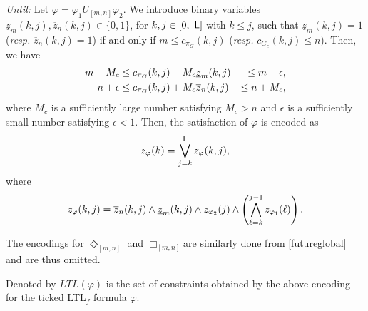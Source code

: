 \documentclass[journal,twoside,web]{IEEEtran}
\newcommand{\req}[1]{\eqref{#1}}
\newcommand{\Len}{{\sf L}}
\begin{document}
\textit{Until:} 
Let $\varphi = \varphi_1 U_{[m,n]} \varphi_2$. We introduce binary variables $\underline{z}_m (k, j), \overline{z}_n (k, j) \in \{0, 1\}$, for $k, j \in [0,\ \Len]$ with $k\leq j$,
such that $\underline{z}_m (k,j) = 1$ ({\sl resp.} $\overline{z}_n (k, j) = 1$) if and only if $m \leq c_{\pi_G} (k, j)$ ({\sl resp.} $c_{G_e}(k,j) \leq n$). Then, we have 
\begin{eqnarray}
m - M_c &\leq c_{\pi_G} (k, j) - M_c \underline{z}_m(k,j) &\leq m - \epsilon, \notag\\ 
{n} + \epsilon  &\leq  c_{\pi_G} (k, j) + M_c \overline{z}_n(k,j) &\leq {n}+M_c, \notag
\end{eqnarray}
where $M_c$ is a sufficiently large number satisfying $M_c >n$ and $\epsilon$ is a sufficiently small number satisfying $\epsilon<1$.
Then, the satisfaction of $\varphi$ is encoded as 
\begin{align}%
z_\varphi (k) = \bigvee^{\Len} _{j=k} z_\varphi (k, j),
\end{align}
where 
\begin{align}%
z_\varphi (k, j) = \overline{z}_n (k,j) \wedge  \underline{z}_m (k,j) \wedge z_{\varphi_2} (j) \wedge \left(\bigwedge^{j-1} _{\ell=k} z_{\varphi_1} (\ell) \right).  \notag 
\end{align}

The encodings for $\Diamond_{[m,n]}$ and $\Box_{[m,n]}$are similarly done from  \req{futureglobal} and are thus omitted. 
%

Denoted by $LTL(\varphi)$ is the set of constraints obtained by the above encoding for the ticked LTL$_f$ formula $\varphi$. 



\end{document}
